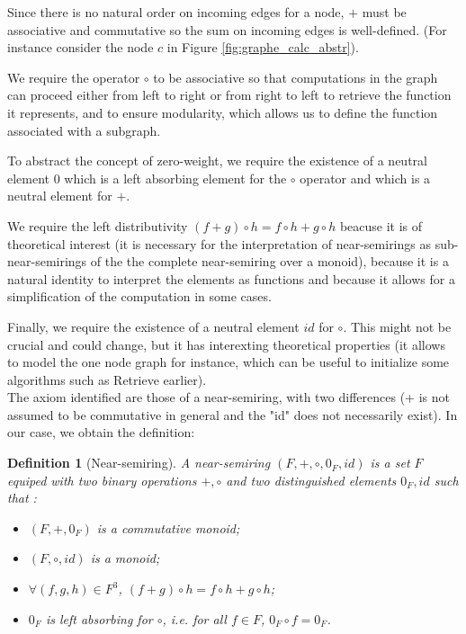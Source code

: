 \documentclass[11pt,a4paper]{article}
\newtheorem{definition}{Definition}
\begin{document}
Since there is no natural order on incoming edges for a node, $+$ must be associative and commutative so the sum on incoming edges is well-defined. (For instance consider the node $c$ in Figure \ref{fig:graphe_calc_abstr}).

We require the operator $\circ$ to be associative so that computations in the graph can proceed either from left to right or from right to left to retrieve the function it represents, and to ensure modularity, which allows us to define the function associated with a subgraph.

To abstract the concept of zero-weight, we require the existence of a neutral element $0$ which is a left absorbing element for the $\circ$ operator and which is a neutral element for $+$.

We require the left distributivity $(f+g) \circ h = f \circ h + g \circ h$ beacuse it is of theoretical interest (it is necessary for the interpretation of near-semirings as sub-near-semirings of the the complete near-semiring over a monoid), because it is a natural identity to interpret the elements as functions and because it allows for a simplification of the computation in some cases.

Finally, we require the existence of a neutral element $id$ for $\circ$. This might not be crucial and could change, but it has interexting theoretical properties (it allows to model the one node graph for instance, which can be useful to initialize some algorithms such as Retrieve earlier). 
\\

The axiom identified are those of a near-semiring, with two differences (+ is not assumed to be commutative in general and the "id" does not necessarily exist). In our case, we obtain the definition:

\begin{definition}[Near-semiring]

	A \textit{near-semiring} $(F,+,\circ,0_F,id)$ is a set $F$ equiped with two binary operations $+,\circ$ and two distinguished elements $0_F,id$ such that :
	
	\begin{itemize}
	
		\item $(F,+,0_F)$ is a commutative monoid;
		
		\item $(F,\circ,id)$ is a monoid;
		
		\item $\forall (f,g,h) \in F^3$, $(f+g) \circ h = f \circ h + g \circ h$;
		
		\item $0_F$ is left absorbing for $\circ$, i.e. for all $f \in F$, $0_F \circ f = 0_F$.
			
	\end{itemize}

\end{definition}
\end{document}
